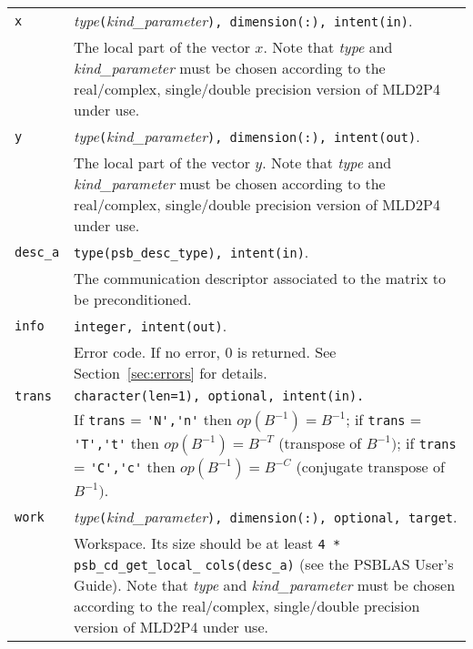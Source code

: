 \begin{tabular}{p{1.2cm}p{12cm}}
\verb|x|      & \emph{type}\verb|(|\emph{kind\_parameter}\verb|), dimension(:), intent(in)|.\\
              & The local part of the vector $x$. Note that \emph{type} and   
                \emph{kind\_parameter} must be chosen according
                to the real/complex, single/double precision version of MLD2P4 under use.\\
\verb|y|      & \emph{type}\verb|(|\emph{kind\_parameter}\verb|), dimension(:), intent(out)|.\\
              & The local part of the vector $y$. Note that \emph{type} and
                \emph{kind\_parameter} must be chosen according
                to the real/complex, single/double precision version of MLD2P4 under use.\\
\verb|desc_a| & \verb|type(psb_desc_type), intent(in)|. \\
              & The communication descriptor associated to the matrix to be
                preconditioned.\\
\verb|info|   & \verb|integer, intent(out)|.\\
              & Error code. If no error, 0 is returned. See Section~\ref{sec:errors} for details.\\
\verb|trans|  & \verb|character(len=1), optional, intent(in).|\\
              & If \verb|trans| = \verb|'N','n'| then $op(B^{-1}) = B^{-1}$;
                if \verb|trans| = \verb|'T','t'| then $op(B^{-1}) = B^{-T}$
                (transpose of $B^{-1})$;  if \verb|trans| = \verb|'C','c'| then $op(B^{-1}) = B^{-C}$
                (conjugate transpose of $B^{-1})$.\\
\verb|work|  & \emph{type}\verb|(|\emph{kind\_parameter}\verb|), dimension(:), optional, target|.\\
             & Workspace. Its size should be at
               least \verb|4 * psb_cd_get_local_| \verb|cols(desc_a)| (see the PSBLAS User's Guide).
               Note that \emph{type} and \emph{kind\_parameter} must be chosen according
               to the real/complex, single/double precision version of MLD2P4 under use.\\
\end{tabular}

